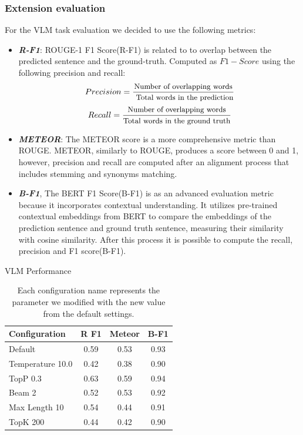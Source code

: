 \documentclass[10pt,twocolumn,letterpaper]{article}
\begin{document}
\subsubsection{Extension evaluation}
For the VLM task evaluation we decided to use the following metrics:
\begin{itemize}
    \item \textit{\textbf{R-F1}}: ROUGE-1 F1 Score(R-F1) is related to to overlap between the predicted sentence and the ground-truth. Computed as $F1-Score$ using the following precision and recall: 
    \begin{equation*}
        Precision = \frac{\text{\small Number of overlapping words}}{\text{ \small Total words in the prediction}}
    \end{equation*}
     \begin{equation}
        Recall = \frac{\text{\small Number of overlapping words}}{\text{\small Total words in the ground truth}}
    \end{equation}
    \item \textit{\textbf{METEOR}}: The METEOR score is a more comprehensive metric than ROUGE. METEOR, similarly to ROUGE, produces a score between 0 and 1, however, precision and recall are computed after an alignment process that includes stemming and synonyms matching.
    \item \textit{\textbf{B-F1}}, The BERT F1 Score(B-F1) is as an advanced evaluation metric because it incorporates contextual understanding. It utilizes pre-trained contextual embeddings from BERT to compare the embeddings of the prediction sentence and ground truth sentence, measuring their similarity with cosine similarity. After this process it is possible to compute the recall, precision and F1 score(B-F1).
\end{itemize}

\begin{table}[h]
\centering
\caption{VLM Performance}
\label{tab:comparisonSCore}
\begin{tabular}{@{}lccc@{}}
\toprule
Configuration & R F1 & Meteor & B-F1 \\ \midrule
Default & 0.59 & 0.53 & 0.93 \\
Temperature 10.0 & 0.42 & 0.38 & 0.90 \\
TopP 0.3 & 0.63 & 0.59 & 0.94 \\
Beam 2 & 0.52 & 0.53 & 0.92 \\
Max Length 10 & 0.54 & 0.44 & 0.91 \\
TopK 200 & 0.44 & 0.42 & 0.90\\
\bottomrule
\end{tabular}
\captionsetup{font=footnotesize}
\caption*{Each configuration name represents the parameter we modified with the new value from the default settings.}
\end{table}
\end{document}
